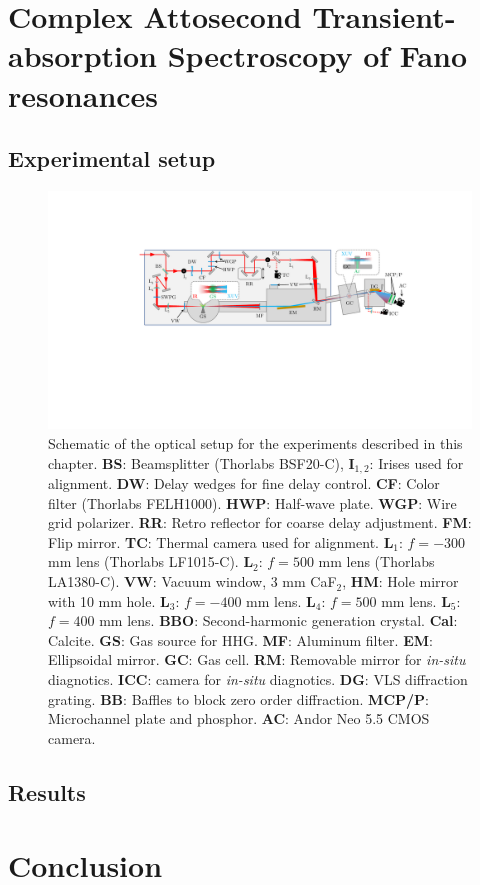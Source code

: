 \section{Complex Attosecond Transient-absorption Spectroscopy of Fano resonances}
\label{sec:CATS_ar}

\subsection{Experimental setup}
\label{sec:CATS_ar_exp_setup}

\begin{figure}
	\centering
	\includegraphics[width=1.0\textwidth]{figures/CATS/beamline_schematic_CATS.pdf}
	\caption[TABLe experimental setup for ATS experiments]{Schematic of the optical setup for the experiments described in this chapter.  \textbf{BS}: Beamsplitter (Thorlabs BSF20-C), \textbf{I$_{1,2}$}: Irises used for alignment. \textbf{DW}: Delay wedges for fine delay control. \textbf{CF}: Color filter (Thorlabs FELH1000). \textbf{HWP}: Half-wave plate. \textbf{WGP}: Wire grid polarizer. \textbf{RR}: Retro reflector for coarse delay adjustment.  \textbf{FM}: Flip mirror. \textbf{TC}: Thermal camera used for alignment.  \textbf{L$_1$}: $f=-300$ mm lens (Thorlabs LF1015-C). \textbf{L$_2$}: $f=500$ mm lens (Thorlabs LA1380-C). \textbf{VW}: Vacuum window, 3 mm CaF$_2$, \textbf{HM}: Hole mirror with 10 mm hole.  \textbf{L$_3$}: $f=-400$ mm lens.  \textbf{L$_4$}: $f=500$ mm lens. \textbf{L$_5$}: $f=400$ mm lens.  \textbf{BBO}: Second-harmonic generation crystal.  \textbf{Cal}: Calcite. \textbf{GS}: Gas source for HHG. \textbf{MF}: Aluminum filter. \textbf{EM}: Ellipsoidal mirror. \textbf{GC}: Gas cell. \textbf{RM}: Removable mirror for \textit{in-situ} diagnotics.    \textbf{ICC}: camera for \textit{in-situ} diagnotics. \textbf{DG}: VLS diffraction grating. \textbf{BB}: Baffles to block zero order diffraction.  \textbf{MCP/P}: Microchannel plate and phosphor.  \textbf{AC}: Andor Neo 5.5 CMOS camera.}
	\label{fig:CATS_setup}
\end{figure}



\subsection{Results}
\label{sec:CATS_ar_results}


\section{Conclusion}
\label{sec:CATS_conclusion}